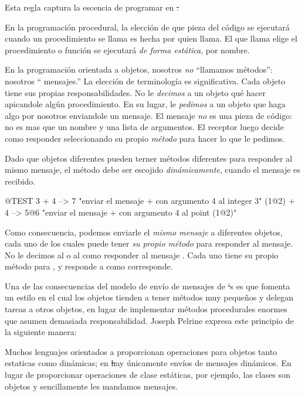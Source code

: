 \documentclass[a4paper,10pt,twoside]{book}
\begin{document}

Esta regla captura la escencia de programar en \st.

En la programaci\'on procedural, la elecci\'on de que pieza del c\'odigo se ejecutar\'a cuando un procedimiento se llama es hecha por quien llama.
El que llama elige el procedimiento o funci\'on se ejecutar\'a \emph{de forma est\'atica}, por nombre.  

En la programaci\'on orientada a objetos, nosotros \emph{no} ``llamamos m\'etodos'': nosotros `` mensajes.''
La elecci\'on de terminolog\'ia es significativa.
Cada objeto tiene sus propias responsabilidades.
No le \emph{decimos} a un objeto qu\'e hacer apicandole alg\'un procedimiento.
En su lugar, le \emph{pedimos} a un objeto que haga algo por nosotros enviandole un mensaje.
El mensaje \emph{no} es una pieza de c\'odigo: no es mas que un nombre y una lista de argumentos.
El receptor luego decide como responder seleccionando su propio \emph{m\'etodo} para hacer lo que le pedimos.

Dado que objetos diferentes pueden terner m\'etodos diferentes para responder al mismo mensaje, el m\'etodo debe ser escojido \emph{din\'amicamente}, cuando el mensaje es recibido.
\begin{code}{@TEST}
3 + 4         --> 7          "enviar el mensaje + con argumento 4 al integer  3"
(1@2) + 4 --> 5@6    "enviar el mensaje + con argumento 4 al point (1@2)"
\end{code}
\noindent
Como consecuencia, podemos enviarle el \emph{mismo mensaje} a diferentes objetos, cada uno de los cuales puede tener \emph{su propio m\'etodo} para responder al mensaje.
No le decimos al   o al   como responder al mensaje .
Cada uno tiene su propio m\'etodo para \ct{+}, y responde a  como corresponde.

Una de las consecuencias del modelo de env\'io de mensajes de \st's es que fomenta un estilo en el cual los objetos tienden a tener m\'etodos muy peque\~nos y delegan tareas a otros objetos, en lugar de implementar m\'etodos procedurales enormes que asumen demasiada responsabilidad.
Joseph Pelrine expresa este principio de la siguiente manera:


Muchos lenguajes orientados a proporcionan operaciones para objetos tanto estaticas como din\'amicas; en \st hay \'unicamente env\'ios de mensajes din\'amicos. En lugar de proporcionar operaciones de clase est\'aticas, por ejemplo, las clases son objetos y sencillamente les mandamos mensajes.
\end{document}

